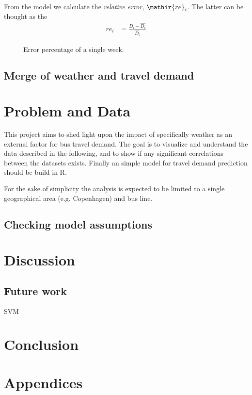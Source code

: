 \documentclass[a4paper,11pt]{article}
\begin{document}
From the model we calculate the \emph{relative error}, $\mathir{re}_i$. The latter can be thought as the 
\begin{align}
    \mathit{re}_i &= \frac{D_i - \widehat{D_i}}{\widehat{D_i}}
    \label{eq:error}
\end{align}

\begin{figure}[!ht]
    \center
    
    \caption{Error percentage of a single week.}
    \label{fig:travelcard_error_pct}
\end{figure}

\subsection{Merge of weather and travel demand}


\clearpage

\section{Problem and Data}\label{ch:data_old}
This project aims to shed light upon the impact of specifically weather as an external factor for bus travel demand. The goal is to visualize and understand the data described in the following, and to show if any significant correlations between the datasets exists. Finally an simple model for travel demand prediction should be build in R.

For the sake of simplicity the analysis is expected to be limited to a single geographical area (e.g. Copenhagen) and bus line.

\subsection{Checking model assumptions}

\section{Discussion}

\subsection{Future work}
SVM 

\section{Conclusion}

\clearpage
\begin{spacing}{1}
  
  
\end{spacing}

\clearpage
\appendix
\section*{Appendices}
\renewcommand{\thesubsection}{\Alph{subsection}}


\clearpage

\clearpage

\end{document}
